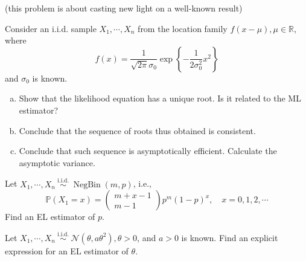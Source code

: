 \begin{ex}
    (this problem is about casting new light on a well-known result) 

    Consider an i.i.d. sample \(X_{1}, \cdots, X_{n}\) from the location family \(f(x-\mu), \mu \in \mathbb{R}\), where
    \[
        f(x)=\frac{1}{\sqrt{2 \pi} \sigma_{0}} \exp \left\{-\frac{1}{2 \sigma_{0}^{2}} x^{2}\right\}
    \]
    and \(\sigma_{0}\) is known. 
    \begin{enumerate}[(a)]
        \item Show that the likelihood equation has a unique root. Is it related to the ML estimator? 
        \item Conclude that the sequence of roots thus obtained is consistent. 
        \item Conclude that such sequence is asymptotically efficient. Calculate the asymptotic variance. 
    \end{enumerate}
\end{ex}

\begin{ex}
    Let \(X_{1}, \cdots, X_{n} \stackrel{\text { i.i.d. }}{\sim} \operatorname{NegBin}(m, p)\), i.e.,
    \[
        \mathbb{P}\left(X_{1}=x\right)=\left(\begin{array}{c}
        m+x-1 \\
        m-1
        \end{array}\right) p^{m}(1-p)^{x}, \quad x=0,1,2, \cdots
    \]
    Find an EL estimator of \(p\). 
\end{ex}


\begin{ex}
    Let \(X_{1}, \cdots, X_{n} \stackrel{\text { i.i.d. }}{\sim} \mathcal{N}\left(\theta, a \theta^{2}\right), \theta>0\), and \(a>0\) is known. Find an explicit expression for an EL estimator of \(\theta\). 
\end{ex}

